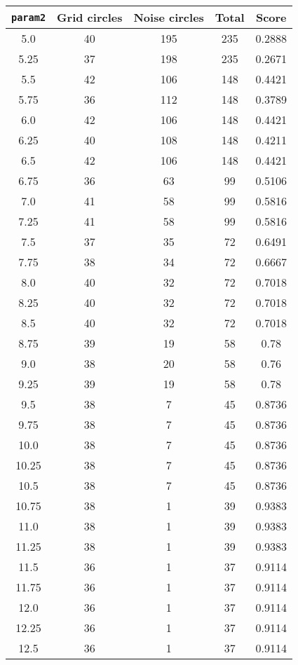 \documentclass[letterpaper, 12pt]{article}
\begin{document}
\begin{longtable}{|c|c|c|c|c|}
\hline
\textbf{\texttt{param2}} & \textbf{Grid circles} & \textbf{Noise circles} & \textbf{Total} & \textbf{Score} \\
\hline
5.0 & 40 & 195 & 235 & 0.2888 \\
\hline
5.25 & 37 & 198 & 235 & 0.2671 \\
\hline
5.5 & 42 & 106 & 148 & 0.4421 \\
\hline
5.75 & 36 & 112 & 148 & 0.3789 \\
\hline
6.0 & 42 & 106 & 148 & 0.4421 \\
\hline
6.25 & 40 & 108 & 148 & 0.4211 \\
\hline
6.5 & 42 & 106 & 148 & 0.4421 \\
\hline
6.75 & 36 & 63 & 99 & 0.5106 \\
\hline
7.0 & 41 & 58 & 99 & 0.5816 \\
\hline
7.25 & 41 & 58 & 99 & 0.5816 \\
\hline
7.5 & 37 & 35 & 72 & 0.6491 \\
\hline
7.75 & 38 & 34 & 72 & 0.6667 \\
\hline
8.0 & 40 & 32 & 72 & 0.7018 \\
\hline
8.25 & 40 & 32 & 72 & 0.7018 \\
\hline
8.5 & 40 & 32 & 72 & 0.7018 \\
\hline
8.75 & 39 & 19 & 58 & 0.78 \\
\hline
9.0 & 38 & 20 & 58 & 0.76 \\
\hline
9.25 & 39 & 19 & 58 & 0.78 \\
\hline
9.5 & 38 & 7 & 45 & 0.8736 \\
\hline
9.75 & 38 & 7 & 45 & 0.8736 \\
\hline
10.0 & 38 & 7 & 45 & 0.8736 \\
\hline
10.25 & 38 & 7 & 45 & 0.8736 \\
\hline
10.5 & 38 & 7 & 45 & 0.8736 \\
\hline
10.75 & 38 & 1 & 39 & 0.9383 \\
\hline
11.0 & 38 & 1 & 39 & 0.9383 \\
\hline
11.25 & 38 & 1 & 39 & 0.9383 \\
\hline
11.5 & 36 & 1 & 37 & 0.9114 \\
\hline
11.75 & 36 & 1 & 37 & 0.9114 \\
\hline
12.0 & 36 & 1 & 37 & 0.9114 \\
\hline
12.25 & 36 & 1 & 37 & 0.9114 \\
\hline
12.5 & 36 & 1 & 37 & 0.9114 \\

\end{longtable}
\end{document}
